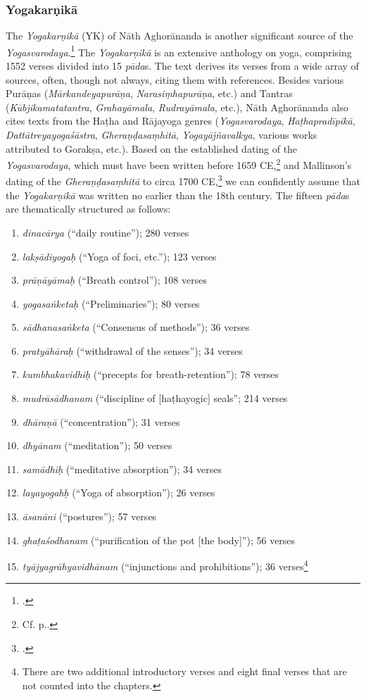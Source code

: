 \subsubsection{Yogakarṇikā}
\label{karni}
The \emph{Yogakarṇikā} (YK) of Nāth Aghorānanda is another significant source of the \emph{Yogasvarodaya}.\footnote{\cite{yogakarnika}.} The \emph{Yogakarṇikā} is an extensive anthology on yoga, comprising 1552 verses divided into 15 \textit{pāda}s. The text derives its verses from a wide array of sources, often, though not always, citing them with references. Besides various Purāṇas (\emph{Mārkandeyapurāṇa}, \emph{Narasiṃhapurāṇa}, etc.) and Tantras (\textit{Kūbjikamatatantra}, \textit{Grahayāmala}, \emph{Rudrayāmala}, etc.), Nāth Aghorānanda also cites texts from the Haṭha and Rājayoga genres (\emph{Yogasvarodaya}, \emph{Haṭhapradīpikā}, \emph{Dattātreyayogaśāstra}, \emph{Gheraṇḍasaṃhitā}, \emph{Yogayājñavalkya}, various works attributed to Gorakṣa, etc.). Based on the established dating of the \emph{Yogasvarodaya}, which must have been written before 1659 CE,\footnote{Cf. p.\pageref{dating}.} and Mallinson's dating of the \emph{Gheraṇḍasaṃhitā} to circa 1700 CE,\footnote{\citeauthor[2004: xiv]{MallinsonGheranda}.} we can confidently assume that the \emph{Yogakarṇikā} was written no earlier than the 18th century.
The fifteen \textit{pāda}s are thematically structured as follows:

\begin{enumerate}
\item \textit{dinacārya} (``daily routine''); 280 verses
\item \textit{lakṣādiyogaḥ} (``Yoga of foci, etc.''); 123 verses
\item \textit{prāṇāyāmaḥ} (``Breath control''); 108 verses
\item \textit{yogasaṅketaḥ} (``Preliminaries''); 80 verses
\item \textit{sādhanasaṅketa} (``Consensus of methods''); 36 verses
\item \textit{pratyāhāraḥ} (``withdrawal of the senses''); 34 verses
\item \textit{kumbhakavidhiḥ} (``precepts for breath-retention''); 78 verses
\item \textit{mudrāsādhanam} (``discipline of [haṭhayogic] seals''; 214 verses
\item \textit{dhāraṇā} (``concentration''); 31 verses
\item \textit{dhyānam} (``meditation''); 50 verses
\item \textit{samādhiḥ} (``meditative absorption''); 34 verses
\item \textit{layayogahḥ} (``Yoga of absorption''); 26 verses
\item \textit{āsanāni} (``postures''); 57 verses
\item \textit{ghaṭaśodhanam} (``purification of the pot [the body]''); 56 verses
\item \textit{tyājyagrāhyavidhānam} (``injunctions and prohibitions''); 36 verses\footnote{There are two additional introductory verses and eight final verses that are not counted into the chapters.}
\end{enumerate}

